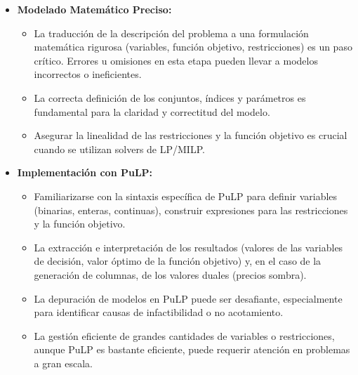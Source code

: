 \documentclass[a4paper,12pt]{article}
\begin{document}
\begin{itemize}
    \item \textbf{Modelado Matemático Preciso:}
    \begin{itemize}
        \item La traducción de la descripción del problema a una formulación matemática rigurosa (variables, función objetivo, restricciones) es un paso crítico. Errores u omisiones en esta etapa pueden llevar a modelos incorrectos o ineficientes.
        \item La correcta definición de los conjuntos, índices y parámetros es fundamental para la claridad y correctitud del modelo.
        \item Asegurar la linealidad de las restricciones y la función objetivo es crucial cuando se utilizan solvers de LP/MILP.
    \end{itemize}

    \item \textbf{Implementación con PuLP:}
    \begin{itemize}
        \item Familiarizarse con la sintaxis específica de PuLP para definir variables (binarias, enteras, continuas), construir expresiones para las restricciones y la función objetivo.
        \item La extracción e interpretación de los resultados (valores de las variables de decisión, valor óptimo de la función objetivo) y, en el caso de la generación de columnas, de los valores duales (precios sombra).
        \item La depuración de modelos en PuLP puede ser desafiante, especialmente para identificar causas de infactibilidad o no acotamiento.
        \item La gestión eficiente de grandes cantidades de variables o restricciones, aunque PuLP es bastante eficiente, puede requerir atención en problemas a gran escala.
    \end{itemize}


\end{itemize}
\end{document}
